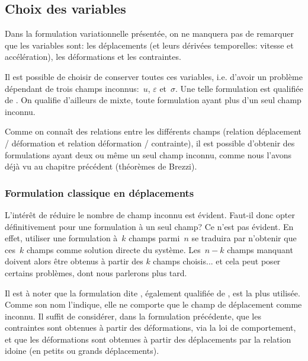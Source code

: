 \medskip
\subsection{Choix des variables}\label{Sec-form}

Dans la formulation variationnelle présentée, on ne manquera pas de remarquer que les variables sont: les déplacements (et leurs dérivées temporelles: vitesse et accélération), les déformations et les contraintes.

Il est possible de choisir de conserver toutes ces variables, i.e. d'avoir un problème dépendant de trois champs inconnus:~$u$, $\varepsilon$ et~$\sigma$. Une telle formulation est qualifiée de . On qualifie d'ailleurs de mixte, toute formulation ayant plus d'un seul champ inconnu.

Comme on connaît des relations entre les différents champs (relation déplacement / déformation et relation déformation / contrainte), il est possible d'obtenir des formulations ayant deux ou même un seul champ inconnu, comme nous l'avons déjà vu au chapitre précédent (théorèmes de Brezzi).

\medskip
\subsubsection{Formulation classique en déplacements}
L'intérêt de réduire le nombre de champ inconnu est évident. Faut-il donc opter définitivement pour une formulation à un seul champ?
Ce n'est pas évident. En effet, utiliser une formulation à~$k$ champs parmi~$n$ se traduira par n'obtenir que ces~$k$ champs comme solution directe du système. Les~$n-k$ champs manquant doivent alors être obtenus à partir des $k$ champs choisis... et cela peut poser certains problèmes, dont nous parlerons plus tard.

Il est à noter que la formulation dite , également qualifiée de , est la plus utilisée. Comme son nom l'indique, elle ne comporte que le champ de déplacement comme inconnu. Il suffit de considérer, dans la formulation précédente, que les contraintes sont obtenues à partir des déformations, via la loi de comportement, et que les déformations sont obtenues à partir des déplacements par la relation idoine (en petits ou grands déplacements).

